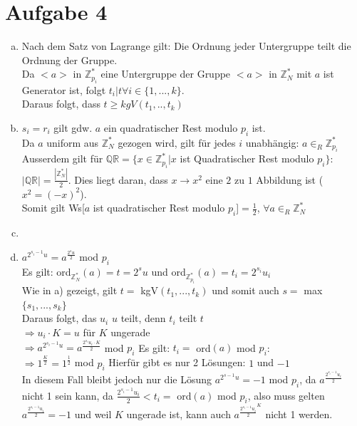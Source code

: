 \documentclass[a4paper]{scrartcl}
\begin{document}
\section*{Aufgabe 4}
\begin{enumerate}[a)]
\item Nach dem Satz von Lagrange gilt: Die Ordnung jeder Untergruppe teilt die Ordnung der Gruppe.\\
Da $<a>$ in $\mathbb{Z}_{p_i}^*$ eine Untergruppe der Gruppe $<a>$ in $\mathbb{Z}_N^*$ mit $a$ ist Generator ist, folgt $t_i | t \forall i \in \{1, ..., k\}$.\\
Daraus folgt, dass $t\geq kgV(t_1,..,t_k)$


\item $s_i = r_i$ gilt gdw. $a$ ein quadratischer Rest modulo $p_i$ ist.\\
 Da $a$ uniform aus $\mathbb{Z}_N^*$ gezogen wird, gilt für jedes $i$ unabhängig: $a\in_R\mathbb{Z}_{p_i}^*$\\
Ausserdem gilt für $\mathbb{QR}=\{x\in \mathbb{Z}_{p_i}^*|x$ ist Quadratischer Rest modulo $p_i\}$: $|\mathbb{QR}|=\frac{|\mathbb{Z}_N^*|}{2}$. Dies liegt daran, dass $x \rightarrow x^2$ eine $2$ zu $1$ Abbildung ist ($x^2=(-x)^2$).\\
Somit gilt Ws[$a$ ist quadratischer Rest modulo $p_i$]$=\frac{1}{2}$, $\forall a\in_R\mathbb{Z}_N^*$

\item 

\item $a^{2^{s_i-1}u}= a^{\frac{2^{s}u}{2}}$ mod $p_i$\\
Es gilt: ord$_{\mathbb{Z}_N^*}(a)=t=2^{s}u$ und ord$_{\mathbb{Z}_{p_i}^*}(a)=t_i=2^{s_i}u_i$\\
Wie in a) gezeigt, gilt $t=$ kgV$(t_1,...,t_k)$ und somit auch $s=$ max$\{s_1, ...,s_k\}$\\
Daraus folgt, das $u_i$ $u$ teilt, denn $t_i$ teilt $t$\\
$\Rightarrow u_i \cdot K = u$ für $K$ ungerade\\
$\Rightarrow a^{2^{s_i-1}u}=a^{\frac{2^{s_i}u_i\cdot K}{2}}$ mod $p_i$ Es gilt: $t_i = $ ord$(a)$ mod $p_i$:\\
$\Rightarrow 1^{\frac{K}{2}} = 1^{\frac{1}{2}}$ mod $p_i$ Hierfür gibt es nur 2 Lösungen: $1$ und $-1$\\
In diesem Fall bleibt jedoch nur die Lösung $a^{2^{s-1}u}= -1$ mod $p_i$, da $a^{\frac{2^{s_i-1}u_i}{2}}$ nicht 1 sein kann, da $\frac{2^{s_i-1}u_i}{2} < t_i =$ ord$(a)$ mod $p_i$, also muss gelten $a^{\frac{2^{s_i-1}u_i}{2}}=-1$ und weil $K$ ungerade ist, kann auch $a^{\frac{2^{s_i-1}u_i}{2}^K}$ nicht 1 werden.


\end{enumerate}
\end{document}
